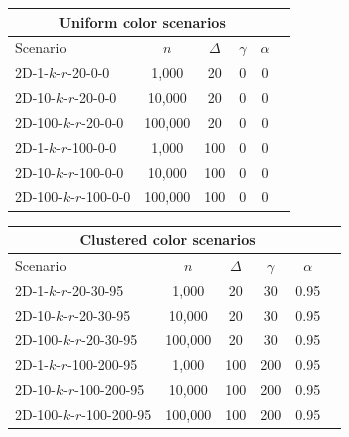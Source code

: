\documentclass{article}
\begin{document}
\hskip-2.4cm
\begin{tabular}{|l||c|c|c|c|c|}
    \hline
    \multicolumn{5}{|c|}{Uniform color scenarios}             \\
    \hline
    Scenario       & $n$     & $\Delta$ & $\gamma$ & $\alpha$ \\
    \hline
    2D-1-$k$-$r$-20-0-0    & 1,000   & 20       & 0        & 0        \\
    2D-10-$k$-$r$-20-0-0   & 10,000  & 20       & 0        & 0        \\
    2D-100-$k$-$r$-20-0-0  & 100,000 & 20       & 0        & 0        \\
    2D-1-$k$-$r$-100-0-0   & 1,000   & 100      & 0        & 0        \\
    2D-10-$k$-$r$-100-0-0  & 10,000  & 100      & 0        & 0        \\
    2D-100-$k$-$r$-100-0-0 & 100,000 & 100      & 0        & 0        \\
    \hline
\end{tabular}
\:\:
\begin{tabular}{|l||c|c|c|c|c|}
    \hline
    \multicolumn{5}{|c|}{Clustered color scenarios}              \\
    \hline
    Scenario          & $n$     & $\Delta$ & $\gamma$ & $\alpha$ \\
    \hline
    2D-1-$k$-$r$-20-30-95     & 1,000   & 20       & 30       & 0.95     \\
    2D-10-$k$-$r$-20-30-95    & 10,000  & 20       & 30       & 0.95     \\
    2D-100-$k$-$r$-20-30-95   & 100,000 & 20       & 30       & 0.95     \\
    2D-1-$k$-$r$-100-200-95   & 1,000   & 100      & 200      & 0.95     \\
    2D-10-$k$-$r$-100-200-95  & 10,000  & 100      & 200      & 0.95     \\
    2D-100-$k$-$r$-100-200-95 & 100,000 & 100      & 200      & 0.95     \\
    \hline
\end{tabular}\\\\
\end{document}
